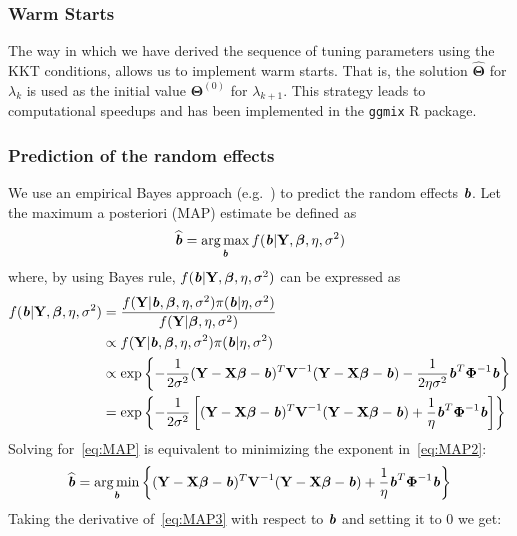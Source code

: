 \documentclass[12pt,letter]{article}\usepackage[]{graphicx}\usepackage[]{color}
\newcommand{\bX}{\textbf{X}}
\newcommand{\bY}{\textbf{Y}}
\newcommand{\bV}{\textbf{V}}
\newcommand{\bb}{\textbf{\emph{b}}}
\newcommand{\bTheta}{\boldsymbol{\Theta}}
\newcommand{\bbeta}{\boldsymbol{\beta}}
\newcommand{\bPhi}{\boldsymbol{\Phi}}
\DeclareMathOperator*{\argmin}{arg\,min}
\DeclareMathOperator*{\argmax}{arg\,max}
\begin{document}
\subsubsection{Warm Starts}
The way in which we have derived the sequence of tuning parameters using the KKT conditions, allows us to implement warm starts. That is, the solution $\widehat{\bTheta}$ for $\lambda_k$ is used as the initial value $\bTheta^{(0)}$ for $\lambda_{k+1}$. This strategy leads to computational speedups and has been implemented in the \texttt{ggmix} R package.

\subsubsection{Prediction of the random effects}
We use an empirical Bayes approach (e.g.~\cite{wakefield2013bayesian}) to predict the random effects $\bb$. Let the maximum a posteriori (MAP) estimate be defined as
\begin{equation}
	\widehat{\bb} = \argmax_{\bb} f(\bb |  \bY, \bbeta, \eta, \sigma^2)  \label{eq:MAP}
\end{equation}
where, by using Bayes rule, $f(\bb |  \bY, \bbeta, \eta, \sigma^2)$ can be expressed as
\begin{align}
	f(\bb |  \bY, \bbeta, \eta, \sigma^2) & = \frac{f(\bY | \bb,  \bbeta, \eta, \sigma^2)  \pi(\bb | \eta, \sigma^2)}{f(\bY |  \bbeta, \eta, \sigma^2)} \nonumber \\
	& \propto f(\bY | \bb,  \bbeta, \eta, \sigma^2)  \pi(\bb | \eta, \sigma^2) \nonumber\\
	& \propto \exp \left\lbrace - \frac{1}{2 \sigma^2} (\bY - \bX \bbeta - \bb)^T \bV^{-1} (\bY - \bX \bbeta - \bb) - \frac{1}{2\eta \sigma^2}\bb^T \bPhi^{-1}\bb   \right \rbrace \nonumber\\
	& = \exp \left\lbrace - \frac{1}{2 \sigma^2} \left[  (\bY - \bX \bbeta - \bb)^T \bV^{-1} (\bY - \bX \bbeta - \bb) + \frac{1}{\eta }\bb^T \bPhi^{-1}\bb \right]    \right \rbrace \label{eq:MAP2}
\end{align}
Solving for~\eqref{eq:MAP} is equivalent to minimizing the exponent in~\eqref{eq:MAP2}:
\begin{align}
	\widehat{\bb} = \argmin_{\bb} \left\lbrace  (\bY - \bX \bbeta - \bb)^T \bV^{-1} (\bY - \bX \bbeta - \bb) + \frac{1}{\eta }\bb^T \bPhi^{-1}\bb \right\rbrace \label{eq:MAP3}
\end{align}
Taking the derivative of~\eqref{eq:MAP3} with respect to $\bb$ and setting it to 0 we get:
\end{document}
